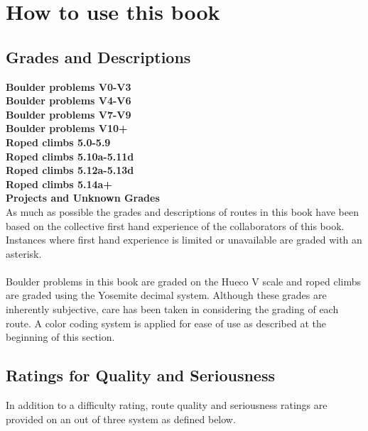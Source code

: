 \section{How to use this book}
\subsection*{Grades and Descriptions}
\colorbox{green!20}{\textbf{Boulder problems V0-V3}}\\
\colorbox{RoyalBlue!20}{\textbf{Boulder problems V4-V6}}\\
\colorbox{Goldenrod!50}{\textbf{Boulder problems V7-V9}}\\
\colorbox{red!20}{\textbf{Boulder problems V10+}}\\
\colorbox{green!20}{\textbf{Roped climbs 5.0-5.9}}\\
\colorbox{RoyalBlue!20}{\textbf{Roped climbs 5.10a-5.11d}}\\
\colorbox{Goldenrod!50}{\textbf{Roped climbs 5.12a-5.13d}}\\
\colorbox{red!20}{\textbf{Roped climbs 5.14a+}}\\
\colorbox{black!20}{\textbf{Projects and Unknown Grades}}\\
As much as possible the grades and descriptions of routes in this book have been based on the collective first hand experience of the collaborators of this book. Instances where first hand experience is limited or unavailable are graded with an asterisk.\\
\\
Boulder problems in this book are graded on the Hueco V scale and roped climbs are graded using the Yosemite decimal system. Although these grades are inherently subjective, care has been taken in considering the grading of each route. A color coding system is applied for ease of use as described at the beginning of this section.\\
\subsection*{Ratings for Quality and Seriousness}
In addition to a difficulty rating, route quality and seriousness ratings are provided on an out of three system as defined below.
